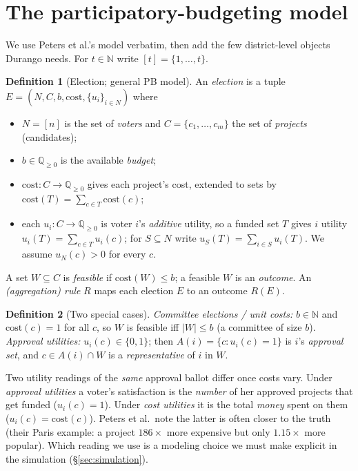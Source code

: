 \documentclass[11pt,letterpaper]{article}
\theoremstyle{definition}
\newtheorem{definition}{Definition}[section]
\theoremstyle{plain}
\theoremstyle{remark}
\newcommand{\Q}{\mathbb{Q}}
\newcommand{\voters}{N}            %
\newcommand{\projects}{C}          %
\newcommand{\budget}{b}            %
\newcommand{\cost}{\mathrm{cost}}  %
\begin{document}
\section{The participatory-budgeting model}
\label{sec:model}

We use Peters et al.'s model verbatim, then add the few district-level objects Durango needs.
For $t\in\mathbb{N}$ write $[t]=\{1,\dots,t\}$.

\begin{definition}[Election; general PB model]
An \emph{election} is a tuple $E=(\voters, \projects, \budget, \cost, \{u_i\}_{i\in \voters})$ where
\begin{itemize}[leftmargin=1.4em,itemsep=1pt,topsep=2pt]
  \item $\voters=[n]$ is the set of \emph{voters} and $\projects=\{c_1,\dots,c_m\}$ the set of
  \emph{projects} (candidates);
  \item $\budget\in\Q_{\ge 0}$ is the available \emph{budget};
  \item $\cost\colon \projects\to\Q_{\ge 0}$ gives each project's cost, extended to sets by
  $\cost(T)=\sum_{c\in T}\cost(c)$;
  \item each $u_i\colon \projects\to\Q_{\ge 0}$ is voter $i$'s \emph{additive} utility, so a funded
  set $T$ gives $i$ utility $u_i(T)=\sum_{c\in T}u_i(c)$; for $S\subseteq \voters$ write
  $u_S(T)=\sum_{i\in S}u_i(T)$. We assume $u_\voters(c)>0$ for every $c$.
\end{itemize}
A set $W\subseteq \projects$ is \emph{feasible} if $\cost(W)\le \budget$; a feasible $W$ is an
\emph{outcome}. An \emph{(aggregation) rule} $R$ maps each election $E$ to an outcome $R(E)$.
\end{definition}

\begin{definition}[Two special cases]
\emph{Committee elections / unit costs:} $\budget\in\mathbb{N}$ and $\cost(c)=1$ for all $c$, so
$W$ is feasible iff $|W|\le \budget$ (a committee of size $\budget$).
\emph{Approval utilities:} $u_i(c)\in\{0,1\}$; then $A(i)=\{c: u_i(c)=1\}$ is $i$'s
\emph{approval set}, and $c\in A(i)\cap W$ is a \emph{representative} of $i$ in $W$.
\end{definition}

\begin{watchout}
Two utility readings of the \emph{same} approval ballot differ once costs vary. Under
\emph{approval utilities} a voter's satisfaction is the \emph{number} of her approved projects that
get funded ($u_i(c)=1$). Under \emph{cost utilities} it is the total \emph{money} spent on them
($u_i(c)=\cost(c)$). Peters et al.\ note the latter is often closer to the truth (their Paris
example: a project $186\times$ more expensive but only $1.15\times$ more popular). Which reading we
use is a modeling choice we must make explicit in the simulation (\S\ref{sec:simulation}).
\end{watchout}
\end{document}

